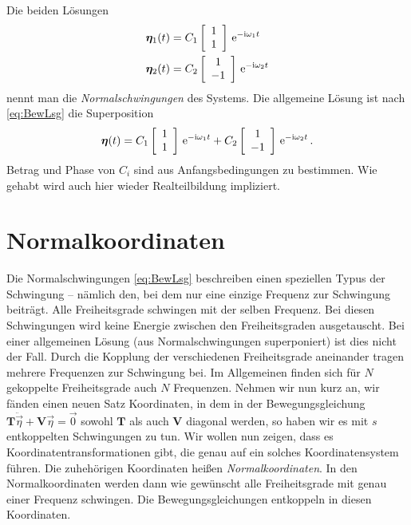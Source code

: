 \documentclass[paper=a4, fontsize=11.0pt, abstractoff, DIV12]{scrartcl}
\begin{document}
Die beiden Lösungen
\begin{align}
{\ensuremath{\boldsymbol{\eta}}}_1(t) &= C_1 \left[ \begin{array}{c} 1 \\ 1 \end{array} \right]\,{\mathrm{e}}^{-\mathrm{i}\omega_1 t}\\
{\boldsymbol{\eta}}_2(t) &= C_2 \left[ \begin{array}{c} 1 \\ -1 \end{array} \right]\,{\mathrm{e}}^{-\mathrm{i} \omega_2 t}
\end{align}
nennt man die \emph{Normalschwingungen} des Systems. Die
allgemeine Lösung ist nach \eqref{eq:BewLsg} die Superposition
\begin{equation}
{\ensuremath{\boldsymbol{\eta}}}(t) = C_1 \left[ \begin{array}{c} 1 \\ 1 \end{array} \right]\,{\mathrm{e}}^{-\mathrm{i}\omega_1 t} + C_2 \left[ \begin{array}{c} 1 \\ -1 \end{array} \right]\,{\mathrm{e}}^{-\mathrm{i} \omega_2 t}\, .
\end{equation}
Betrag und Phase von $C_i$ sind aus Anfangsbedingungen zu bestimmen. Wie
gehabt wird auch hier wieder Realteilbildung impliziert.

\section{Normalkoordinaten}

Die Normalschwingungen \eqref{eq:BewLsg} beschreiben einen speziellen Typus
der Schwingung -- nämlich den, bei dem nur eine einzige Frequenz zur
Schwingung beiträgt. Alle Freiheitsgrade schwingen mit der selben Frequenz.
Bei diesen Schwingungen wird keine Energie zwischen den Freiheitsgraden
ausgetauscht. Bei einer allgemeinen Lösung (aus Normalschwingungen
superponiert) ist dies nicht der Fall. Durch die Kopplung der verschiedenen
Freiheitsgrade aneinander tragen mehrere Frequenzen zur Schwingung bei. Im
Allgemeinen finden sich für $N$ gekoppelte Freiheitsgrade
auch $N$ Frequenzen. Nehmen wir nun kurz an, wir fänden einen neuen Satz
Koordinaten, in dem in der Bewegungsgleichung $\mathbf{T} \ddot{\vec\eta} +
\mathbf{V}{\vec\eta} = \vec 0$ sowohl $\mathbf{T}$ als auch $\mathbf{V}$
diagonal werden, so haben wir es mit $s$ entkoppelten Schwingungen zu tun.
Wir wollen nun zeigen, dass es Koordinatentransformationen gibt, die genau
auf ein solches Koordinatensystem führen. Die zuhehörigen Koordinaten heißen
\emph {Normalkoordinaten}. In den Normalkoordinaten werden dann wie
gewünscht alle Freiheitsgrade mit genau einer Frequenz schwingen. Die
Bewegungsgleichungen entkoppeln in diesen Koordinaten.
\end{document}
